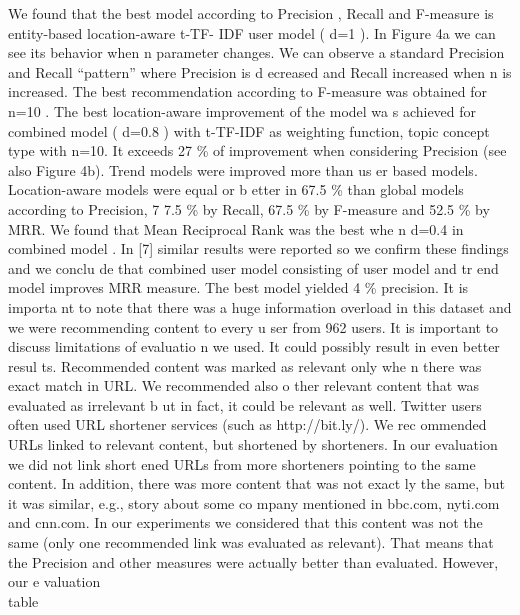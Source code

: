\documentclass[conference]{IEEEtran}
\begin{document}
We  found  that  the  best  model  according  to  Precision
, 
Recall  and  F-measure  is  entity-based  location-aware
  t-TF-
IDF  user  model (
d=1
). In  Figure 4a  we  can  see its behavior 
when 
n
  parameter  changes.  We  can  observe  a  standard 
Precision  and  Recall  “pattern”  where  Precision  is  d
ecreased 
and   Recall   increased   when 
n
   is   increased.   The   best 
recommendation  according  to  F-measure  was  obtained 
for 
n=10
. 
The  best  location-aware  improvement  of  the  model  wa
s 
achieved  for  combined  model  (
d=0.8
)  with  t-TF-IDF  as 
weighting function, topic concept type with 
n=10.
 It exceeds 
27 \%  of  improvement  when  considering  Precision  (see
  also 
Figure  4b).  Trend  models  were  improved  more  than  us
er 
based models. Location-aware models were equal or b
etter in 
67.5 \% than global models according to Precision, 7
7.5 \% by 
Recall, 67.5 \% by F-measure and 52.5 \% by MRR. 
We found that Mean Reciprocal Rank was the best whe
n 
d=0.4
   in   combined   model
.
   In   [7]   similar   results   were 
reported  so  we  confirm  these  findings  and  we  conclu
de  that 
combined  user  model  consisting  of  user  model  and  tr
end 
model improves MRR measure. 
The  best  model  yielded  4  \%  precision.  It  is  importa
nt  to 
note  that  there  was  a  huge  information  overload  in 
this 
dataset  and  we  were  recommending  content  to  every  u
ser 
from 962 users.  
It  is  important  to  discuss  limitations  of  evaluatio
n  we 
used.   It   could   possibly   result   in   even   better   resul
ts. 
Recommended  content  was  marked  as  relevant  only  whe
n 
there was exact match in URL. We recommended also o
ther 
relevant content that was evaluated as irrelevant b
ut in fact, it 
could  be  relevant  as  well.  Twitter  users  often  used
  URL 
shortener  services  (such  as  http://bit.ly/).  We  rec
ommended 
URLs    linked    to    relevant    content,    but    shortened    by 
shorteners. In our evaluation we did not link short
ened URLs 
from   more   shorteners   pointing   to   the   same   content. 
In 
addition,  there  was  more  content  that  was  not  exact
ly  the 
same,  but  it  was  similar,  e.g.,  story  about  some  co
mpany 
mentioned   in   bbc.com,   nyti.com   and   cnn.com.   In   our 
experiments  we  considered  that  this  content  was  not
  the 
same   (only   one   recommended   link   was   evaluated   as 
relevant).  That  means  that  the  Precision  and  other 
measures 
were actually better than evaluated. However, our e
valuation 
\\ table
\\
\end{document}

